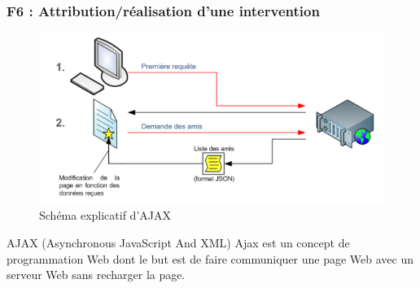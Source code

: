 \begin{frame}
\frametitle{F6 : Attribution/réalisation d'une intervention}
      \begin{figure}[r]
		\includegraphics[scale=0.27]{images/ajax.png}
		\caption{Schéma explicatif d'AJAX}
	  \end{figure}
      \begin{block}{AJAX (Asynchronous JavaScript And XML)}
		Ajax est un concept de programmation Web dont le but est de faire communiquer une page Web avec un serveur Web sans recharger la page.
	  \end{block}
\end{frame}
